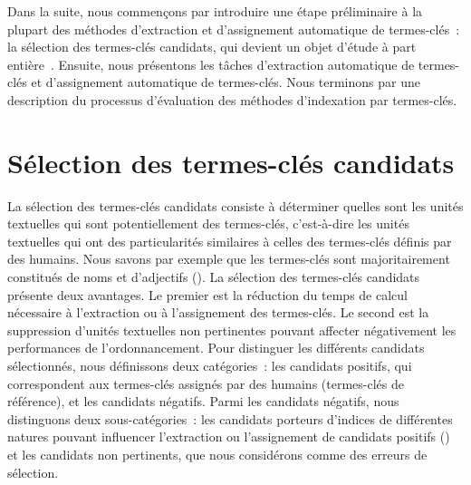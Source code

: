     Dans la suite, nous commençons par introduire une étape préliminaire à la
    plupart des méthodes d'extraction et d'assignement automatique de
    termes-clés~: la sélection des termes-clés candidats, qui devient un objet
    d'étude à part entière~\cite{wang2014keyphraseextractionpreprocessing}.
    Ensuite, nous présentons les tâches d'extraction automatique de termes-clés
    et d'assignement automatique de termes-clés. Nous terminons par une
    description du processus d'évaluation des méthodes d'indexation par
    termes-clés.


  \section{Sélection des termes-clés candidats}
  \label{sec:main-state_of_the_art-keyphrase_candidate_selection}
    La sélection des termes-clés candidats consiste à déterminer quelles sont
    les unités textuelles qui sont potentiellement des termes-clés, c'est-à-dire
    les unités textuelles qui ont des particularités similaires à celles des
    termes-clés définis par des humains. Nous savons par exemple que les
    termes-clés sont majoritairement constitués de noms et d'adjectifs
    (). La sélection des termes-clés candidats présente deux
    avantages. Le premier est la réduction du temps de calcul nécessaire à
    l'extraction ou à l'assignement des termes-clés. Le second est la
    suppression d'unités textuelles non pertinentes pouvant affecter
    négativement les performances de l'ordonnancement. Pour distinguer les
    différents candidats sélectionnés, nous définissons deux catégories~: les
    candidats positifs, qui correspondent aux termes-clés assignés par des
    humains (termes-clés de référence), et les candidats négatifs. Parmi les
    candidats négatifs, nous distinguons deux sous-catégories~: les candidats
    porteurs d'indices de différentes natures pouvant
    influencer l'extraction ou l'assignement de candidats positifs
    () et les candidats non pertinents,
    que nous considérons comme des erreurs de sélection.

